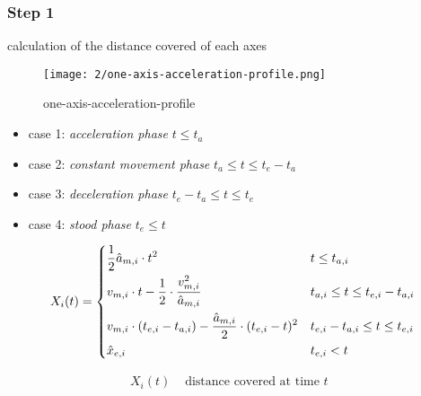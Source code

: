 \documentclass[%
  professionalfonts,%
  xcolor={%
    usenames,%
    dvipsnames,%
    svgnames,%
    table,%
    hyperref%
  }%
]{beamer}
\begin{document}
\subsubsection{Step 1}
\begin{frame}
calculation of the distance covered of each axes \\

\begin{figure}[h]
  \texttt{[image: 2/one-axis-acceleration-profile.png]}
  \caption{one-axis-acceleration-profile}
  \label{fig:ti-movement-cases}
\end{figure}

\begin{itemize}
\item case 1: \emph{acceleration phase} $t \leq t_{a}$
\item case 2: \emph{constant movement phase} $t_{a} \le t \leq t_{e} - t_{a}$
\item case 3: \emph{deceleration phase} $t_{e} - t_{a} \le t \leq t_{e}$
\item case 4: \emph{stood phase} $t_{e} \le t$
\end{itemize}

\end{frame}

\begin{frame}
\begin{equation}
X_{i}(t) = 
\begin{dcases}
\frac{1}{2} \hat{a}_{m,i} \cdot t^2  & t \leq t_{a,i} \\
v_{m,i} \cdot t - \frac{1}{2} \cdot \frac{v_{m,i}^2}{\hat{a}_{m,i}} & t_{a,i} \le t \leq t_{e,i} - t_{a,i} \\
v_{m,i} \cdot (t_{e,i} - t_{a,i}) - \frac{\hat{a}_{m,i}}{2} \cdot (t_{e,i} - t)^2 & t_{e,i} - t_{a,i} \le t \leq t_{e,i}\\
\hat{x}_{e,i} & t_{e,i} < t\\
\end{dcases}
\end{equation}

\begin{align*}
X_{i}(t) & \text{ distance covered at time $t$ } \\
\end{align*}
\end{frame}
\end{document}
